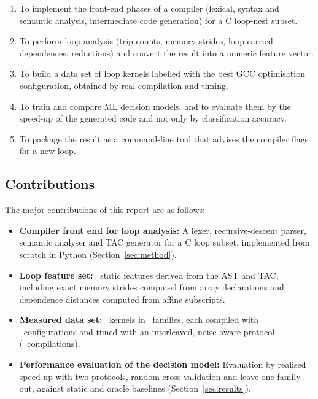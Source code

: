 \begin{enumerate}
    \item To implement the front-end phases of a compiler (lexical, syntax and
    semantic analysis, intermediate code generation) for a C loop-nest subset.

    \item To perform loop analysis (trip counts, memory strides, loop-carried
    dependences, reductions) and convert the result into a numeric feature
    vector.

    \item To build a data set of loop kernels labelled with the best GCC
    optimisation configuration, obtained by real compilation and timing.

    \item To train and compare ML decision models, and to evaluate them by the
    speed-up of the generated code and not only by classification accuracy.

    \item To package the result as a command-line tool that advises the
    compiler flags for a new loop.
\end{enumerate}

\subsection{Contributions}

The major contributions of this report are as follows:

\begin{itemize}
    \item \textbf{Compiler front end for loop analysis:}
    A lexer, recursive-descent parser, semantic analyser and TAC generator for
    a C loop subset, implemented from scratch in Python
    (Section~\ref{sec:method}).

    \item \textbf{Loop feature set:}
    \numFeatures\ static features derived from the AST and TAC, including
    exact memory strides computed from array declarations and
    dependence distances computed from affine subscripts.

    \item \textbf{Measured data set:}
    \numKernels\ kernels in \numFamilies\ families, each compiled with
    \numConfigs\ configurations and timed with an interleaved, noise-aware
    protocol (\numCompiles\ compilations).

    \item \textbf{Performance evaluation of the decision model:}
    Evaluation by realised speed-up with two protocols, random cross-validation
    and leave-one-family-out, against static and oracle baselines
    (Section~\ref{sec:results}).
\end{itemize}

